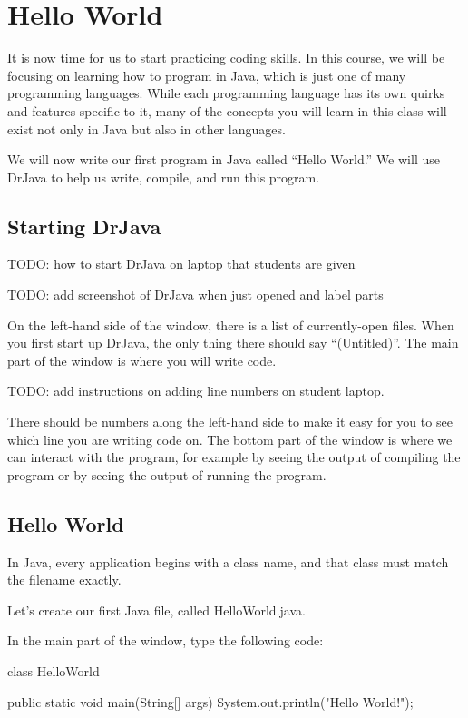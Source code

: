 \chapter{Hello World}

It is now time for us to start practicing coding skills.
In this course, we will be focusing on learning how to program
in Java, which is just one of many programming languages.
While each programming language has its own quirks and features
specific to it, many of the concepts you will learn in this
class will exist not only in Java but also in other languages.

We will now write our first program in Java called ``Hello World.''
We will use DrJava to help us write, compile, and run this program.

\section{Starting DrJava}
TODO: how to start DrJava on laptop that students are given

TODO: add screenshot of DrJava when just opened and label parts


On the left-hand side of the window, there is a list of currently-open files. When you first start up DrJava, the only thing there should say ``(Untitled)''.
The main part of the window is where you will write code.

TODO: add instructions on adding line numbers on student laptop.

There should be numbers along the left-hand side to make it easy for you to see which line you are writing code on. The bottom part of the window is where we can interact with the program, for example by seeing the output of compiling the program or by seeing the output of running the program.

\section{Hello World}

In Java, every application begins with a class name, and that class must match the filename exactly.

Let's create our first Java file, called HelloWorld.java.

In the main part of the window, type the following code:
\begin{code}
class HelloWorld {
    
    public static void main(String[] args) {
        System.out.println("Hello World!");
    }
    
}
\end{code}

